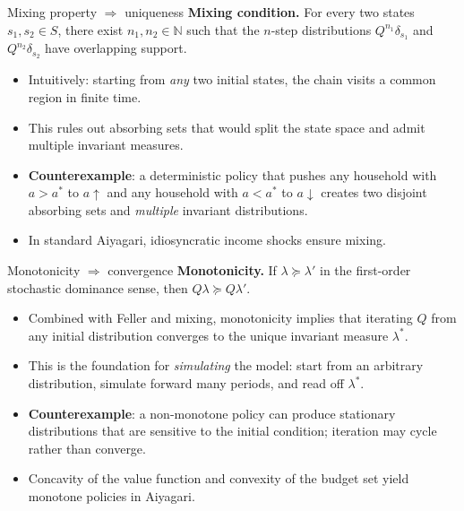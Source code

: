 \documentclass[10pt,english,aspectratio=169]{beamer}
\begin{document}
\begin{frame}{Mixing property $\Rightarrow$ uniqueness}
\textbf{Mixing condition.} For every two states $s_1, s_2 \in S$, there exist $n_1, n_2 \in \mathbb{N}$ such that the $n$-step distributions $Q^{n_1}\delta_{s_1}$ and $Q^{n_2}\delta_{s_2}$ have overlapping support.
\medskip
\begin{itemize}
\item Intuitively: starting from \emph{any} two initial states, the chain visits a common region in finite time.
\medskip
\item This rules out absorbing sets that would split the state space and admit multiple invariant measures.
\medskip
\item \textbf{Counterexample}: a deterministic policy that pushes any household with $a > a^*$ to $a \uparrow$ and any household with $a < a^*$ to $a \downarrow$ creates two disjoint absorbing sets and \emph{multiple} invariant distributions.
\medskip
\item In standard Aiyagari, idiosyncratic income shocks ensure mixing.
\end{itemize}
\end{frame}

\begin{frame}{Monotonicity $\Rightarrow$ convergence}
\textbf{Monotonicity.} If $\lambda \succeq \lambda'$ in the first-order stochastic dominance sense, then $Q\lambda \succeq Q\lambda'$.
\medskip
\begin{itemize}
\item Combined with Feller and mixing, monotonicity implies that iterating $Q$ from any initial distribution converges to the unique invariant measure $\lambda^*$.
\medskip
\item This is the foundation for \emph{simulating} the model: start from an arbitrary distribution, simulate forward many periods, and read off $\lambda^*$.
\medskip
\item \textbf{Counterexample}: a non-monotone policy can produce stationary distributions that are sensitive to the initial condition; iteration may cycle rather than converge.
\medskip
\item Concavity of the value function and convexity of the budget set yield monotone policies in Aiyagari.
\end{itemize}
\end{frame}

\end{document}
